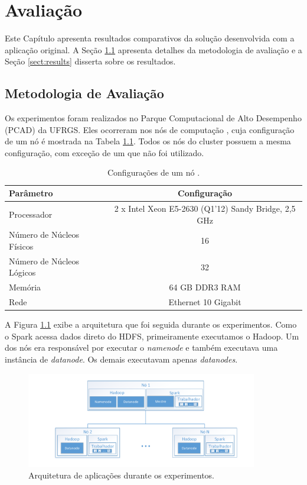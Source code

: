 \chapter{Avaliação} \label{ch:evaluation}

Este Capítulo apresenta resultados comparativos da solução desenvolvida com a 
aplicação original. A Seção \ref{sect:methodology} apresenta detalhes da 
metodologia de avaliação e a Seção \ref{sect:results} disserta sobre os 
resultados.


\section{Metodologia de Avaliação} \label{sect:methodology}

Os experimentos foram realizados no Parque Computacional de Alto Desempenho 
(PCAD) da UFRGS. Eles ocorreram nos nós de computação , cuja 
configuração de um nó é mostrada na Tabela \ref{tab:draco_config}. Todos os nós 
do cluster possuem a mesma configuração, com exceção de um que não foi utilizado.

\begin{table}[H]
\centering
\small
\begin{tabular}{l c} \toprule
\textbf{Parâmetro}  &  \textbf{Configuração} \\ 
\midrule
Processador     & 2 x Intel Xeon E5-2630 (Q1'12) Sandy Bridge, 2,5 GHz  
\\
Número de Núcleos Físicos    & 16  \\
Número de Núcleos Lógicos   & 32   \\
Memória       & 64 GB DDR3 RAM   \\
Rede	      & Ethernet 10 Gigabit \\
\end{tabular}
\caption{Configurações de um nó .}
\label{tab:draco_config}
\end{table}


A Figura \ref{fig:experiment_arch} exibe a arquitetura que foi seguida durante 
os experimentos. Como o Spark acessa dados direto do HDFS, primeiramente 
executamos o Hadoop. Um dos nós era responsável por executar o \textit{namenode} 
e também executava uma instância de \textit{datanode}. Os demais executavam 
apenas \textit{datanodes}.


\begin{figure}[ht]
\centerline{
\includegraphics[width=0.9\textwidth]{./img/experiments_arch.pdf}}
 \caption{Arquitetura de aplicações durante os experimentos.}
 \label{fig:experiment_arch}
\end{figure}


